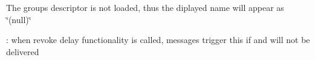 
\begin{DoxyRefList}
\item[Global \mbox{\hyperlink{thread__synch_8h_a785bcde5f08439e91a2c6828bbf5d83d}{load\+Group\+From\+ID}} (const int group\+\_\+id)]\label{bug__bug000003}%
%
The group\textquotesingle{}s descriptor is not loaded, thus the diplayed name will appear as \char`\"{}(null)\char`\"{} 
\item[Global \mbox{\hyperlink{message_8h_af0eb4f46db2a45d736b02c2ac731fdba}{read\+Message}} (msg\+\_\+t $\ast$dest\+\_\+buffer, msg\+\_\+manager\+\_\+t $\ast$manager)]\label{bug__bug000002}%
%
\+: when \textquotesingle{}revoke delay\textquotesingle{} functionality is called, messages trigger this if and will not be delivered 
\end{DoxyRefList}